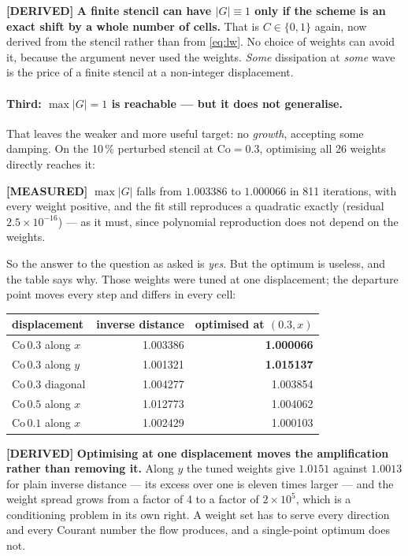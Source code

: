 \documentclass[11pt,a4paper]{article}
\newcommand{\derived}{\textcolor{blue!50!black}{\textbf{[DERIVED]}}}
\newcommand{\measured}{\textcolor{green!35!black}{\textbf{[MEASURED]}}}
\begin{document}
\derived{} \textbf{A finite stencil can have \(|G| \equiv 1\) only if the scheme is an exact
shift by a whole number of cells.} That is \(C \in \{0,1\}\) again, now derived from the stencil
rather than from \eqref{eq:lw}. No choice of weights can avoid it, because the argument never
used the weights. \emph{Some} dissipation at \emph{some} wave is the price of a finite stencil
at a non-integer displacement.

\paragraph{Third: \(\max|G| = 1\) is reachable --- but it does not generalise.}
That leaves the weaker and more useful target: no \emph{growth}, accepting some damping. On the
10\,\% perturbed stencil at \(\mathrm{Co} = 0.3\), optimising all 26 weights directly reaches it:

\measured{} \(\max|G|\) falls from \(1.003386\) to \(1.000066\) in 811 iterations, with every
weight positive, and the fit still reproduces a quadratic exactly (residual \(2.5\times 10^{-16}\)) --- as it must, since polynomial reproduction does not depend on the weights.

So the answer to the question as asked is \emph{yes}. But the optimum is useless, and the table
says why. Those weights were tuned at one displacement; the departure point moves every step
and differs in every cell:

\begin{center}
\begin{tabular}{lrr}
\toprule
displacement & inverse distance & optimised at \((0.3, x)\) \\
\midrule
\(\mathrm{Co}\,0.3\) along \(x\)   & 1.003386 & \textbf{1.000066} \\
\(\mathrm{Co}\,0.3\) along \(y\)   & 1.001321 & \textbf{1.015137} \\
\(\mathrm{Co}\,0.3\) diagonal      & 1.004277 & 1.003854 \\
\(\mathrm{Co}\,0.5\) along \(x\)   & 1.012773 & 1.004062 \\
\(\mathrm{Co}\,0.1\) along \(x\)   & 1.002429 & 1.000103 \\
\bottomrule
\end{tabular}
\end{center}

\derived{} \textbf{Optimising at one displacement moves the amplification rather than removing
it.} Along \(y\) the tuned weights give \(1.0151\) against \(1.0013\) for plain inverse distance
--- its excess over one is eleven times larger --- and the weight spread grows from a factor
of 4 to a factor of \(2\times10^{5}\), which is a conditioning problem in its own right. A weight set has to serve
every direction and every Courant number the flow produces, and a single-point optimum does not.
\end{document}
